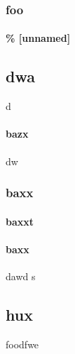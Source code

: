 \documentclass[]{article}
\begin{document}
\section{foo}




\subsection*{\% [unnamed]}



\begin{center}
\part*{dwa}

d




\subsection{bazx} dw




\section{baxx}




\subsection{baxxt}




\end{center}




\subsection{baxx}



dawd
s


\chapter{hux}




foodfwe
\end{document}

